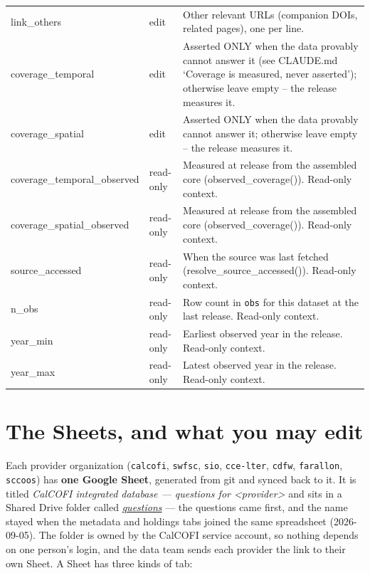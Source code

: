 \documentclass[
  letterpaper,
  DIV=11,
  numbers=noendperiod]{scrreprt}
\begin{document}
\begin{table}
{\begin{tabular*}{\linewidth}{@{\extracolsep{\fill}}lll}
link\_others & {\textcolor[HTML]{66686A}{edit}} & Other relevant URLs (companion DOIs, related pages), one per line. \\ 
coverage\_temporal & {\textcolor[HTML]{66686A}{edit}} & Asserted ONLY when the data provably cannot answer it (see CLAUDE.md `Coverage is measured, never asserted'); otherwise leave empty -- the release measures it. \\ 
coverage\_spatial & {\textcolor[HTML]{66686A}{edit}} & Asserted ONLY when the data provably cannot answer it; otherwise leave empty -- the release measures it. \\ 
coverage\_temporal\_observed & {\textcolor[HTML]{66686A}{read-only}} & Measured at release from the assembled core (observed\_coverage()). Read-only context. \\ 
coverage\_spatial\_observed & {\textcolor[HTML]{66686A}{read-only}} & Measured at release from the assembled core (observed\_coverage()). Read-only context. \\ 
source\_accessed & {\textcolor[HTML]{66686A}{read-only}} & When the source was last fetched (resolve\_source\_accessed()). Read-only context. \\ 
n\_obs & {\textcolor[HTML]{66686A}{read-only}} & Row count in \texttt{obs} for this dataset at the last release. Read-only context. \\ 
year\_min & {\textcolor[HTML]{66686A}{read-only}} & Earliest observed year in the release. Read-only context. \\ 
year\_max & {\textcolor[HTML]{66686A}{read-only}} & Latest observed year in the release. Read-only context. \\ 
\bottomrule
\end{tabular*}

}

\end{table}%

\section{The Sheets, and what you may
edit}\label{the-sheets-and-what-you-may-edit}

Each provider organization (\texttt{calcofi}, \texttt{swfsc},
\texttt{sio}, \texttt{cce-lter}, \texttt{cdfw}, \texttt{farallon},
\texttt{sccoos}) has \textbf{one Google Sheet}, generated from git and
synced back to it. It is titled \emph{CalCOFI integrated database ---
questions for \textless provider\textgreater{}} and sits in a Shared
Drive folder called
\href{https://drive.google.com/drive/folders/1Tryjfd76TNU4nVPPSQiyQCy03uo0hlx6}{\emph{questions}}
--- the questions came first, and the name stayed when the metadata and
holdings tabs joined the same spreadsheet (2026-09-05). The folder is
owned by the CalCOFI service account, so nothing depends on one person's
login, and the data team sends each provider the link to their own
Sheet. A Sheet has three kinds of tab:
\end{document}
